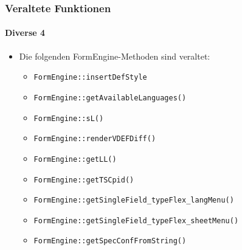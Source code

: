 \begin{frame}[fragile]
	\frametitle{Veraltete Funktionen}
	\framesubtitle{Diverse 4}

	\begin{itemize}
		\item Die folgenden FormEngine-Methoden sind veraltet:
		\begin{itemize}
			\item \texttt{FormEngine::insertDefStyle}
			\item \texttt{FormEngine::getAvailableLanguages()}
			\item \texttt{FormEngine::sL()}
			\item \texttt{FormEngine::renderVDEFDiff()}
			\item \texttt{FormEngine::getLL()}
 			\item \texttt{FormEngine::getTSCpid()}
 			\item \texttt{FormEngine::getSingleField\_typeFlex\_langMenu()}
 			\item \texttt{FormEngine::getSingleField\_typeFlex\_sheetMenu()}
 			\item \texttt{FormEngine::getSpecConfFromString()}
 		\end{itemize}
	\end{itemize}

\end{frame}
